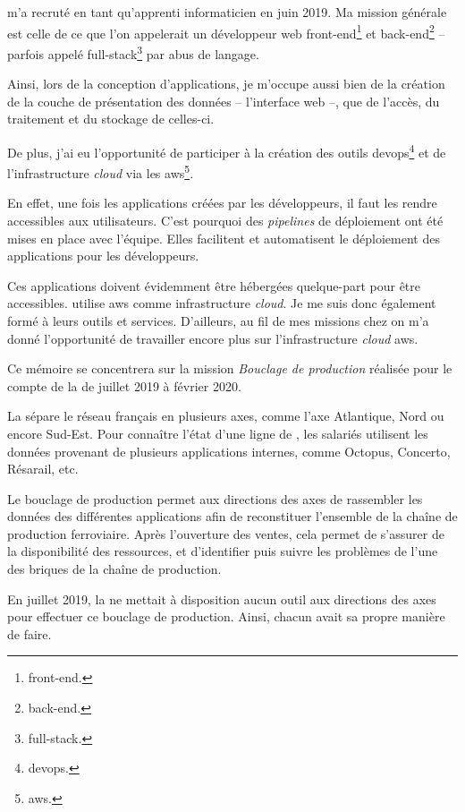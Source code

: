 \entreprise m'a recruté en tant qu'apprenti informaticien en juin 2019.
Ma mission générale est celle de ce que l'on appelerait un développeur web 
\gls{front-end}\footnote{\glsdesc{front-end}.}
et 
\gls{back-end}\footnote{\glsdesc{back-end}.}
-- parfois appelé 
\gls{full-stack}\footnote{\glsdesc{full-stack}.}
par abus de langage.

Ainsi, lors de la conception d'applications, je m'occupe aussi bien de la création de la couche de présentation des données -- l'interface web --, que de l'accès, du traitement et du stockage de celles-ci.

De plus, j'ai eu l'opportunité de participer à la création des outils 
\gls{devops}\footnote{\glsdesc{devops}.}
et de l'infrastructure \textit{cloud} via les
\gls{aws}\footnote{\glsdesc{aws}.}.

En effet, une fois les applications créées par les développeurs, il faut les rendre accessibles aux utilisateurs. C'est pourquoi des \textit{pipelines} de déploiement ont été mises en place avec l'équipe. Elles facilitent et automatisent le déploiement des applications pour les développeurs.

Ces applications doivent évidemment être hébergées quelque-part pour être accessibles. \entreprise utilise \gls{aws} comme infrastructure \textit{cloud}. Je me suis donc également formé à leurs outils et services. D'ailleurs, au fil de mes missions chez \entreprise on m'a donné l'opportunité de travailler encore plus sur l'infrastructure \textit{cloud} \gls{aws}.

\newpage{}

Ce mémoire se concentrera sur la mission \emph{Bouclage de production} réalisée pour le compte de la \sncf de juillet 2019 à février 2020.

La \sncf sépare le réseau \tgv français en plusieurs axes, comme l'axe Atlantique, Nord ou encore Sud-Est.
Pour connaître l'état d'une ligne de \tgv, les salariés utilisent les données provenant de plusieurs applications internes, comme Octopus, Concerto, Résarail, etc.

Le \og bouclage de production \fg permet aux directions des axes de rassembler les données des différentes applications afin de reconstituer l'ensemble de la chaîne de production ferroviaire.
Après l'ouverture des ventes, cela permet de s'assurer de la disponibilité des ressources, et d'identifier puis suivre les problèmes de l'une des briques de la chaîne de production.

En juillet 2019, la \sncf ne mettait à disposition aucun outil aux directions des axes pour effectuer ce bouclage de production. Ainsi, chacun avait sa propre manière de faire.

